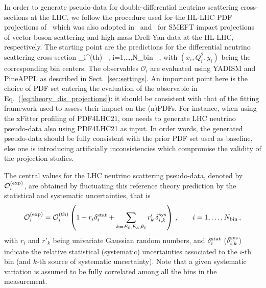  In order to generate pseudo-data for double-differential
 neutrino scattering cross-sections at the LHC, we follow the procedure
 used for the HL-LHC PDF projections of~\cite{AbdulKhalek:2018rok} which was
 also adopted in~\cite{Ethier:2021ydt} and~\cite{Greljo:2021kvv} for SMEFT impact projections
 of vector-boson scattering and high-mass Drell-Yan data at the HL-LHC, respectively.
 The starting point are the predictions for the differential neutrino scattering
 cross-section
 \be
 \label{eq:theory_dis_projections}
 _i^{{\rm (th)}} \equiv {} \, ,\quad
 i=1,\ldots,N_{\rm bin} \, ,
 \ee
 with $(x_i,Q^2_i,y_i)$ being the corresponding bin centers.
 The observables $\mathcal{O}_i $ are evaluated using {\sc\small YADISM} and {\sc\small PineAPPL}
 as described in Sect.~\ref{sec:settings}.
 An important point here is the choice of PDF set entering the evaluation of
 the observable in Eq.~(\ref{eq:theory_dis_projections}): it should be consistent
 with that of the fitting framework used to assess their impact on the (n)PDFs.
 For instance, when using the {\sc\small xFitter} profiling of PDF4LHC21, one needs
 to generate LHC neutrino pseudo-data also using PDF4LHC21 as input.
 In order words, the generated pseudo-data should be fully consistent with the prior PDF
 set used as baseline, else one is introducing artificially inconsistencies which
 compromise the validity of the projection studies.
 
 The central values for the LHC neutrino scattering pseudo-data, denoted
 by $\mathcal{O}_i^{{\rm (exp)}} $, are obtained
 by fluctuating this reference theory prediction by the statistical and systematic
 uncertainties, that is
 \begin{equation}
  \label{eq:pseudo_data}
  \mathcal{O}_i^{{\rm (exp)}}
  =   \mathcal{O}_i^{{\rm (th)}}\left( 1+ r_{i} \delta_{i}^{\rm stat}
  + \sum_{k=E_\ell, E_h,\theta_\ell}
    r'_{k} \,\delta_{i,k}^{{\rm sys}}\right) \, , \qquad i=1,\ldots,N_{\rm bin} \, ,
 \end{equation}
 with $r_{i}$ and $r'_{k}$ being univariate Gaussian random numbers,
 and $\delta_i^{\rm stat}$ ($\delta_{i,k}^{\rm sys}$) indicate the relative statistical (systematic)
 uncertainties associated to the $i$-th bin (and $k$-th source of systematic uncertainty).
 Note that a given systematic variation is assumed to be fully correlated among all the bins
 in the measurement.

